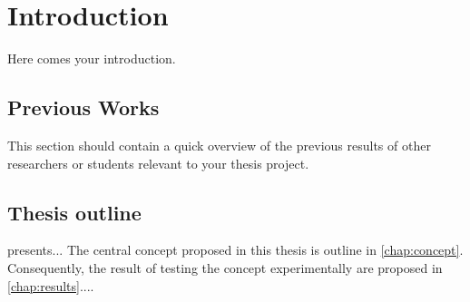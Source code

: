 \chapter{Introduction}
\label{chap:intro}

Here comes your introduction.


\section{Previous Works}
This section should contain a quick overview of the previous results of other researchers or students relevant to your thesis project.

\section{Thesis outline}
 presents...
The central concept proposed in this thesis is outline in \cref{chap:concept}.
Consequently, the result of testing the concept experimentally are proposed in \cref{chap:results}....


